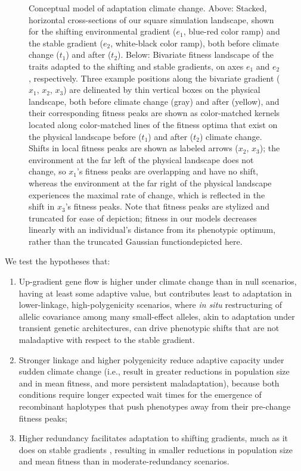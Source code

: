 \documentclass[9pt,twocolumn,twoside,lineno]{pnas-new}
\begin{document}
\begin{figure}
    \caption{Conceptual model of adaptation climate change. Above: Stacked, horizontal cross-sections of our square simulation landscape, shown for the shifting environmental gradient ($e_{1}$, blue-red color ramp) and the stable gradient ($e_{2}$, white-black color ramp), both before climate change ($t_{1}$) and after ($t_{2}$). Below: Bivariate fitness landscape of the traits adapted to the shifting and stable gradients, on axes $e_{1}$ and $e_{2}$, respectively. Three example positions along the bivariate gradient ($x_{1}$, $x_{2}$, $x_{3}$) are delineated by thin vertical boxes on the physical landscape, both before climate change (gray) and after (yellow), and their corresponding fitness peaks are shown as color-matched kernels located along color-matched lines of the fitness optima that exist on the physical landscape before ($t_{1}$) and after ($t_{2}$) climate change. Shifts in local fitness peaks are shown as labeled arrows ($x_{2}$, $x_{3}$); the environment at the far left of the physical landscape does not change, so $x_{1}$'s fitness peaks are overlapping and have no shift, whereas the environment at the far right of the physical landscape experiences the maximal rate of change, which is reflected in the shift in $x_{3}$'s fitness peaks. Note that fitness peaks are stylized and truncated for ease of depiction; fitness in our models decreases linearly with an individual's distance from its phenotypic optimum, rather than the truncated Gaussian functiondepicted here.}
\label{fig:conceptual}
\end{figure}


We test the hypotheses that:
\begin{enumerate}
    \item Up-gradient gene flow is higher under climate change than in null scenarios, having at least some adaptive value, but contributes least to adaptation in lower-linkage, high-polygenicity scenarios, where \textit{in situ} restructuring of allelic covariance among many small-effect alleles, akin to adaptation under transient genetic architectures, can drive phenotypic shifts that are not maladaptive with respect to the stable gradient.
    \item Stronger linkage and higher polygenicity reduce adaptive capacity under sudden climate change (i.e.,  result in greater reductions in population size and in mean fitness, and more persistent maladaptation), because both conditions require longer expected wait times for the emergence of recombinant haplotypes that push phenotypes away from their pre-change fitness peaks;
    \item Higher redundancy facilitates adaptation to shifting gradients, much as it does on stable gradients \cite{barghi_redundancy,manceau,yeaman_amnat}, resulting in smaller reductions in population size and mean fitness than in moderate-redundancy scenarios.
\end{enumerate}
\end{document}

